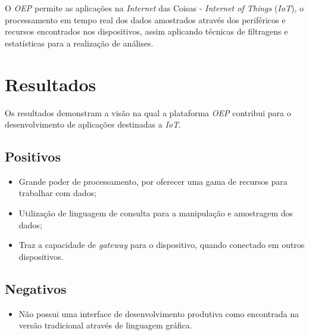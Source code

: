 O \textit{OEP} permite as aplicações na \textit{Internet} das Coisas -
\textit{Internet of Things} (\textit{IoT}), o processamento em tempo real dos
dados amostrados através dos periféricos e recursos encontrados nos
dispositivos, assim aplicando técnicas de filtragens e estatísticas para a
realização de análises.

\section{Resultados}

Os resultados demonstram a visão na qual a plataforma \textit{OEP} contribui
para o desenvolvimento de aplicações destinadas a \textit{IoT}.

\subsection{Positivos}

\begin{itemize}

    \item Grande poder de processamento, por oferecer uma gama de recursos para
    trabalhar com dados;

    \item Utilização de linguagem de consulta para a manipulação e amostragem
    dos dados;

    \item Traz a capacidade de \textit{gateway} para o dispositivo, quando
    conectado em outros dispositivos.

\end{itemize}

\subsection{Negativos}

\begin{itemize}

    \item Não possui uma interface de desenvolvimento produtiva como encontrada
    na versão tradicional através de linguagem gráfica.

\end{itemize}
